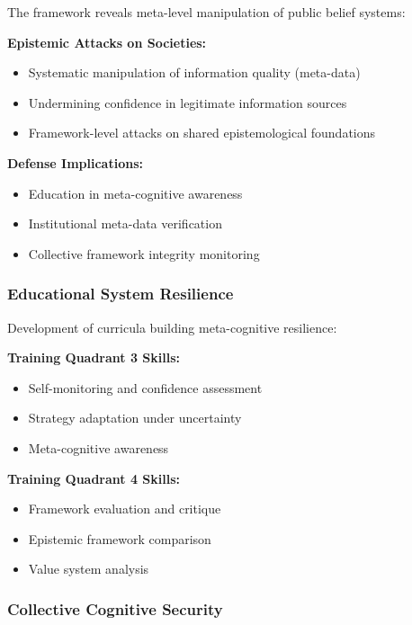 \documentclass[
]{article}
\providecommand{\tightlist}{%
  \setlength{\itemsep}{0pt}\setlength{\parskip}{0pt}}
\begin{document}
The framework reveals meta-level manipulation of public belief systems:

\textbf{Epistemic Attacks on Societies:}

\begin{itemize}
\tightlist
\item
  Systematic manipulation of information quality (meta-data)
\item
  Undermining confidence in legitimate information sources
\item
  Framework-level attacks on shared epistemological foundations
\end{itemize}

\textbf{Defense Implications:}

\begin{itemize}
\tightlist
\item
  Education in meta-cognitive awareness
\item
  Institutional meta-data verification
\item
  Collective framework integrity monitoring
\end{itemize}

\subsubsection{Educational System
Resilience}\label{educational-system-resilience}

Development of curricula building meta-cognitive resilience:

\textbf{Training Quadrant 3 Skills:}

\begin{itemize}
\tightlist
\item
  Self-monitoring and confidence assessment
\item
  Strategy adaptation under uncertainty
\item
  Meta-cognitive awareness
\end{itemize}

\textbf{Training Quadrant 4 Skills:}

\begin{itemize}
\tightlist
\item
  Framework evaluation and critique
\item
  Epistemic framework comparison
\item
  Value system analysis
\end{itemize}

\subsubsection{Collective Cognitive
Security}\label{collective-cognitive-security}
\end{document}
